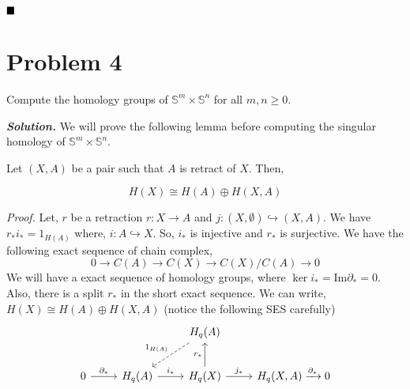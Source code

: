 \documentclass[11pt]{article}
\newcommand{\bb}[1]{\mathbb{#1}}
\newcommand{\s}{\bb{S}}
\newcommand{\p}{\partial}
\newcommand{\sol}{ \textbf{\textit{Solution.}} }
\begin{document}
$\hfill \blacksquare$


 \section{Problem 4}

 \begin{prob}{}{}
    Compute the homology groups of $\mathbb{S}^{m} \times \mathbb{S}^{n}$ for all $m, n \geq 0$.
 \end{prob}

 \sol We will prove the following lemma before computing the singular homology of $\s^m \times \s^n$.

 \begin{Lemn}{ }{}
	Let $(X,A)$ be a pair such that $A$ is retract of $X$. Then,  

                $$H(X) \cong H(A) \oplus H(X,A)$$
\end{Lemn}

\noindent \textit{Proof. } Let, $r$ be a retraction $r : X \to A$ and $j :(X,\emptyset) \hookrightarrow (X,A)$. We have $r_*i_* = 1_{H(A)}$ where, $i : A \hookrightarrow X$.
So, $i_*$ is injective and $r_*$ is surjective. We have the following exact sequence of chain complex,
\[
0 \to C(A) \to C(X) \to C(X)/C(A) \to 0    
\]
We will have a exact sequence of homology groups, where $\ker i_* = \text{Im} \p_* = \qty{0}$. Also, there is a split $r_*$ in the short exact sequence. We can write, $H(X) \cong H(A) \oplus H(X,A)$ (notice the following SES carefully)
\[\begin{tikzcd}
  && {H_{q}(A)} \\
  {0} & {H_{q}(A)} & {H_{q}(X)} & {H_{q}(X,A) \xrightarrow{\p_*} 0}
  \arrow["{\partial_*}", from=2-1, to=2-2]
  \arrow["{i_*}", from=2-2, to=2-3]
  \arrow["{r_*}", from=2-3, to=1-3]
  \arrow["{j_*}", from=2-3, to=2-4]
  \arrow["{1_{H(A)}}"', dashed, from=1-3, to=2-2]
\end{tikzcd}\]
\end{document}
